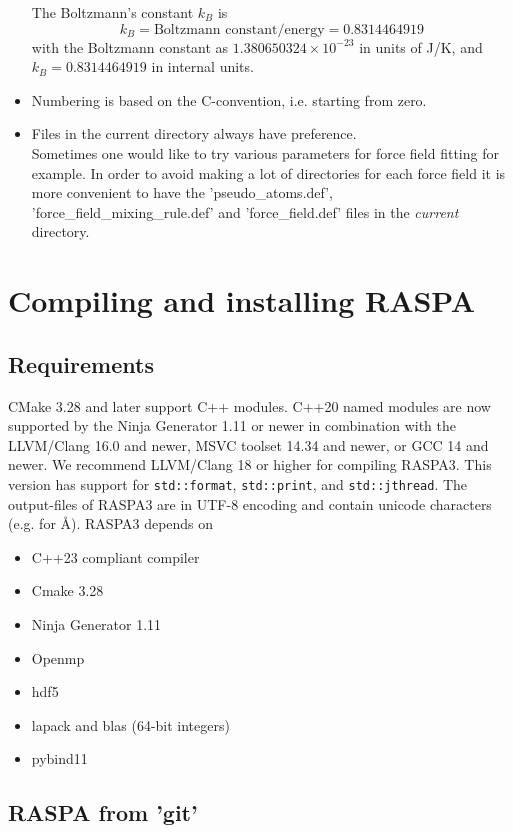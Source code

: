 \begin{itemize}
\noindent
The Boltzmann's constant $k_B$ is
\begin{equation}
 k_B=\text{Boltzmann constant}/\text{energy}=0.8314464919
\end{equation}
with the Boltzmann constant as $1.380650324\times10^{-23}$ in units of J/K, and $k_B=0.8314464919$ in internal units.

\item{Numbering is based on the C-convention, i.e. starting from zero.}
\item{Files in the current directory always have preference.}\\
Sometimes one would like to try various parameters for force field fitting for example. In order to avoid
making a lot of directories for each force field it is more convenient to have the 
'pseudo\_atoms.def', 'force\_field\_mixing\_rule.def'
and 'force\_field.def' files in the \emph{current} directory.
\end{itemize}

\section{Compiling and installing RASPA}

\subsection{Requirements}

CMake 3.28 and later support C++ modules. 
C++20 named modules are now supported by the Ninja Generator 1.11 or newer in combination 
with the LLVM/Clang 16.0 and newer, MSVC toolset 14.34 and newer, or GCC 14 and newer. 
We recommend LLVM/Clang 18 or higher for compiling RASPA3. This version has support 
for \verb+std::format+, \verb+std::print+, and \verb+std::jthread+. 
The output-files of RASPA3 are in UTF-8 encoding and contain unicode characters (e.g. for \AA).
RASPA3 depends on
\begin{itemize}
\item{C++23 compliant compiler}
\item{Cmake 3.28}
\item{Ninja Generator 1.11}
\item{Openmp}
\item{hdf5}
\item{lapack and blas (64-bit integers)}
\item{pybind11}
\end{itemize}

\subsection{RASPA from 'git'}

